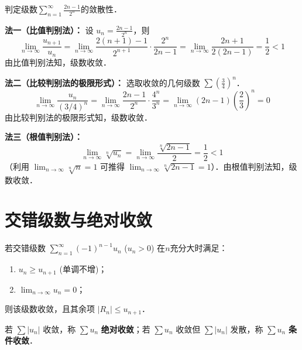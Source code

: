 \documentclass[12pt, a4paper, oneside, UTF8]{ctexbook}
\begin{document}
\begin{example}
    判定级数$\displaystyle\sum_{n=1}^{\infty}\frac{2n-1}{2^n}$的敛散性．
\end{example}
\begin{solution}
    \textbf{法一（比值判别法）：} 设 $u_n = \frac{2n-1}{2^n}$，则
    \[ \lim_{n \to \infty} \frac{u_{n+1}}{u_n} = \lim_{n \to \infty} \frac{2(n+1)-1}{2^{n+1}} \cdot \frac{2^n}{2n-1} = \lim_{n \to \infty} \frac{2n+1}{2(2n-1)} = \frac{1}{2} < 1 \]
    由比值判别法知，级数收敛．

    \textbf{法二（比较判别法的极限形式）：} 选取收敛的几何级数 $\sum \left(\frac{3}{4}\right)^n$．
    \[ \lim_{n \to \infty} \frac{u_n}{(3/4)^n} = \lim_{n \to \infty} \frac{2n-1}{2^n} \cdot \frac{4^n}{3^n} = \lim_{n \to \infty} (2n-1) \left(\frac{2}{3}\right)^n = 0 \]
    由比较判别法的极限形式知，级数收敛．

    \textbf{法三（根值判别法）：}
    \[ \lim_{n \to \infty} \sqrt[n]{u_n} = \lim_{n \to \infty} \frac{\sqrt[n]{2n-1}}{2} = \frac{1}{2} < 1 \]
    （利用 $\lim_{n \to \infty} \sqrt[n]{n} = 1$ 可推得 $\lim_{n \to \infty} \sqrt[n]{2n-1} = 1$）．由根值判别法知，级数收敛．
\end{solution}

\section{交错级数与绝对收敛}
\begin{theorem}
    若交错级数 $\sum_{n=1}^\infty (-1)^{n-1} u_n$ ($u_n > 0$) 在$n$充分大时满足：
    \begin{enumerate}
        \item $u_n \ge u_{n+1}$ (单调不增)；
        \item $\lim_{n \to \infty} u_n = 0$；
    \end{enumerate}
    则该级数收敛，且其余项 $|R_n| \le u_{n+1}$．
\end{theorem}

\begin{definition}[绝对收敛与条件收敛]
    若 $\sum |u_n|$ 收敛，称 $\sum u_n$ \textbf{绝对收敛}；若 $\sum u_n$ 收敛但 $\sum |u_n|$ 发散，称 $\sum u_n$ \textbf{条件收敛}．
\end{definition}
\end{document}
